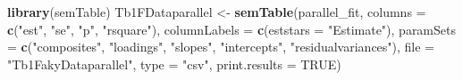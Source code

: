 \documentclass[
  11pt,
]{book}
\newenvironment{Shaded}{\begin{snugshade}}{\end{snugshade}}
\newcommand{\AttributeTok}[1]{\textcolor[rgb]{0.27,0.27,0.27}{#1}}
\newcommand{\ConstantTok}[1]{\textcolor[rgb]{0.37,0.37,0.37}{#1}}
\newcommand{\FunctionTok}[1]{\textcolor[rgb]{0.27,0.27,0.27}{\textbf{#1}}}
\newcommand{\NormalTok}[1]{#1}
\newcommand{\OtherTok}[1]{\textcolor[rgb]{0.37,0.37,0.37}{#1}}
\newcommand{\StringTok}[1]{\textcolor[rgb]{0.5,0.5,0.5}{#1}}
\begin{document}
\begin{Shaded}
\begin{Highlighting}[]
\FunctionTok{library}\NormalTok{(semTable)}
\NormalTok{Tb1FDataparallel }\OtherTok{\textless{}{-}} \FunctionTok{semTable}\NormalTok{(parallel\_fit, }\AttributeTok{columns =} \FunctionTok{c}\NormalTok{(}\StringTok{"est"}\NormalTok{, }\StringTok{"se"}\NormalTok{, }\StringTok{"p"}\NormalTok{, }\StringTok{"rsquare"}\NormalTok{),  }\AttributeTok{columnLabels =} \FunctionTok{c}\NormalTok{(}\AttributeTok{eststars =} \StringTok{"Estimate"}\NormalTok{), }\AttributeTok{paramSets =} \FunctionTok{c}\NormalTok{(}\StringTok{"composites"}\NormalTok{, }\StringTok{"loadings"}\NormalTok{, }\StringTok{"slopes"}\NormalTok{, }\StringTok{"intercepts"}\NormalTok{, }\StringTok{"residualvariances"}\NormalTok{), }\AttributeTok{file =} \StringTok{"Tb1FakyDataparallel"}\NormalTok{, }\AttributeTok{type =} \StringTok{"csv"}\NormalTok{, }\AttributeTok{print.results =} \ConstantTok{TRUE}\NormalTok{)}
\end{Highlighting}
\end{Shaded}
\end{document}
